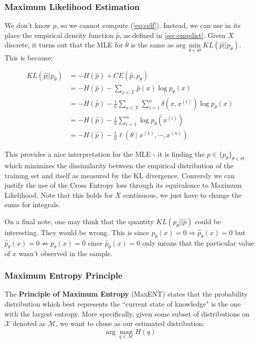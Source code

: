 \documentclass[]{article}
\theoremstyle{mattstyle}
\theoremstyle{definition}
\begin{document}
\subsubsection{Maximum Likelihood Estimation}

We don't know $p$, so we cannot compute (\ref{eq:celf}). Instead, we can use in its place the empirical density function $\hat{p}$, as defined in \ref{sec:empdist}. Given $X$ discrete, it turns out that the MLE for $\theta$ is the same as $\text{arg}\,\min\limits_{\theta\in\Theta} KL(\hat{p}||p_{\theta})$. This is because:

\begin{align*}
KL(\hat{p}||p_{\theta}) &= -H(\hat{p}) + CE(\hat{p},p_{\theta}) \\
&= -H(\hat{p}) - \sum_{x\in\mathcal{X}}\hat{p}(x)\log p_{\theta}(x)\\
&= -H(\hat{p}) - \frac{1}{n}\sum_{x\in\mathcal{X}}\sum_{i=1}^n\delta(x,x^{(i)}) \log p_{\theta}(x)\\
&= -H(\hat{p}) - \frac{1}{n}\sum_{i=1}^n\log p_{\theta}(x^{(i)})\\
&= -H(\hat{p}) - \frac{1}{n}\ell(\theta \mid x^{(1)}, \cdots, x^{(n)})
\end{align*}

This provides a nice interpretation for the MLE - it is finding the $p\in \{p_{\theta}\}_{\theta\in\Theta}$ which minimizes the dissimilarity between the empirical distribution of the training set and itself as measured by the KL divergence. Conversly we can justify the use of the Cross Entropy loss through its equivalence to Maximum Likelihood. Note that this holds for $X$ continuous, we just have to change the sums for integrals.

On a final note, one may think that the quantity $KL(p_{\theta}|| \hat{p})$ could be interesting. They would be wrong. This is since $p_{\theta}(x)=0 \Rightarrow \hat{p}_{\theta}(x)=0$ but $\hat{p}_{\theta}(x)=0 \not\Rightarrow p_{\theta}(x)=0$ since $\hat{p}_{\theta}(x)=0$ only means that the particular value of $x$ wasn't observed in the sample.	


\subsubsection{Maximum Entropy Principle}

The \textbf{Principle of Maximum Entropy} (MaxENT) states that the probability distribution which best represents the ``current state of knowledge" is the one with the largest entropy. More specifically, given some subset of distributions on $\mathcal{X}$ denoted as $\mathcal{M}$, we want to chose as our estimated distribution:
$$\arg\max\limits_{q \in \mathcal{M}} H(q)$$
\end{document}
